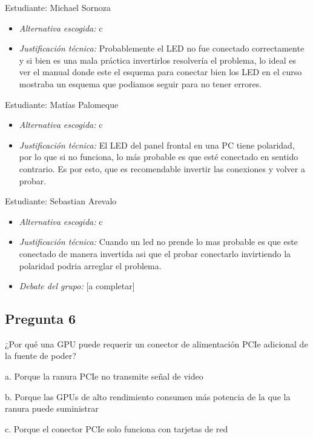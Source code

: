 \documentclass{article}
\begin{document}
Estudiante: Michael Sornoza

\begin{itemize}
\item \emph{Alternativa escogida:} c
\item \emph{Justificación técnica:} Probablemente el LED no fue conectado correctamente y si bien es una mala
práctica  invertirlos resolvería el problema, lo ideal es ver el manual donde este el esquema para conectar bien los LED
en el curso mostraba un esquema que podiamos seguir para no tener errores.
\end{itemize}

Estudiante: Matías Palomeque

\begin{itemize}
\item \emph{Alternativa escogida:} c
\item \emph{Justificación técnica:} El LED del panel frontal en una PC tiene
polaridad, por lo que si no funciona, lo más probable es que esté
conectado en sentido contrario. Es por esto, que es recomendable
invertir las conexiones y volver a probar.
\end{itemize}

Estudiante: Sebastian Arevalo

\begin{itemize}
\item \emph{Alternativa escogida:} c
\item \emph{Justificación técnica:} Cuando un led no prende lo mas probable es
que este conectado de manera invertida asi que el probar conectarlo
invirtiendo la polaridad podria arreglar el problema.
\end{itemize}


\begin{itemize}
\item \emph{Debate del grupo:} [a completar]
\end{itemize}

\subsection{Pregunta 6}
\label{sec:orga7f650c}
¿Por qué una GPU puede requerir un conector de alimentación PCIe adicional de la fuente de poder?

a. Porque la ranura PCIe no transmite señal de video

b. Porque las GPUs de alto rendimiento consumen más potencia de la que la ranura puede suministrar

c. Porque el conector PCIe solo funciona con tarjetas de red
\end{document}
